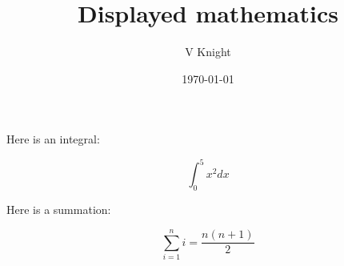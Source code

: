 \documentclass{article}
\title{Displayed mathematics}
\author{V Knight}
\date{\today}
\begin{document}
\maketitle

Here is an integral:

\[
    \int_{0}^{5}x ^ 2dx
\]

Here is a summation:

$$
    \sum_{i=1}^{n}i=\frac{n(n+1)}{2}
$$
\end{document}
